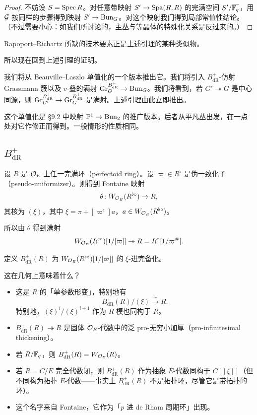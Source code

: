 \begin{proof}
不妨设 $S=\operatorname{Spec} R$。对任意带映射 $S'\to\operatorname{Spa}(R,R)$ 的完满空间 $S'/\overline{\mathbb{F}_q}$，用 $\mathcal{G}$ 按同样的步骤得到映射 $S'\to\mathrm{Bun}_G$。对这个映射我们得到局部常值性结论。（不过需要小心：如我们所讨论的，主丛与等晶体的特殊化关系是反过来的。）
\end{proof}

\begin{remark}
Rapoport–Richartz 所缺的技术要素正是上述引理的某种类似物。
\end{remark}

所以现在回到上述引理的证明。

我们将从 Beauville–Laszlo 单值化的一个版本推出它。我们将引入 $B^+_{\mathrm{dR}}$-仿射 Grassmann 簇以及 $v$-叠的满射 $\mathrm{Gr}^{B^+_{\mathrm{dR}}}_G\to\mathrm{Bun}_G$。我们将看到，若 $G'\twoheadrightarrow G$ 是中心同源，则 $\mathrm{Gr}^{B^+_{\mathrm{dR}}}_{G'}\to\mathrm{Gr}^{B^+_{\mathrm{dR}}}_G$ 是满射。上述引理由此立即推出。

这个单值化是 §9.2 中映射 $\mathbb{P}^1\to\mathrm{Bun}_2$ 的推广版本。后者从平凡丛出发，在一点处对它作修正而得到。一般情形的性质相同。

\subsection{$B^+_{\mathrm{dR}}$}

设 $R$ 是 $\mathcal{O}_E$ 上任一完满环（perfectoid ring）。设 $\varpi\in R^{\flat}$ 是伪一致化子（pseudo-uniformizer）。则得到 Fontaine 映射
\[
\theta\colon W_{\mathcal{O}_E}(R^{\flat\circ})\to R,
\]
其核为 $(\xi)$，其中 $\xi=\pi+[\varpi^{\epsilon}]a$，$a\in W_{\mathcal{O}_E}(R^{\flat\circ})$。

所以由 $\theta$ 得到满射
\[
W_{\mathcal{O}_E}(R^{\flat\circ})[1/[\varpi]]\twoheadrightarrow R=R^{\circ}[1/\varpi^{\#}].
\]

\begin{definition}
定义 $B^+_{\mathrm{dR}}(R)$ 为 $W_{\mathcal{O}_E}(R^{\flat\circ})[1/[\varpi]]$ 的 $\xi$-进完备化。
\end{definition}

这在几何上意味着什么？

\begin{itemize}
\item 这是 $R$ 的「单参数形变」，特别地有
\[
B^+_{\mathrm{dR}}(R)/(\xi)\xrightarrow{\sim}R.
\]
特别地，$(\xi)^i/(\xi)^{i+1}$ 作为 $R$-模也同构于 $R$。
\item $B^+_{\mathrm{dR}}(R)\twoheadrightarrow R$ 是固体 $\mathcal{O}_E$-代数中的泛 pro-无穷小加厚（pro-infinitesimal thickening）。
\item 若 $R/\mathbb{F}_q$，则 $B^+_{\mathrm{dR}}(R)=W_{\mathcal{O}_E}(R)$。
\item 若 $R=C/E$ 完全代数闭，则 $B^+_{\mathrm{dR}}(R)$ 作为抽象 $E$-代数同构于 $C[[\xi]]$（但不同构为拓扑 $E$-代数——事实上 $B^+_{\mathrm{dR}}(R)$ 不是拓扑环，尽管它是带拓扑的环）。
\item 这个名字来自 Fontaine，它作为「$p$ 进 de Rham 周期环」出现。
\end{itemize}

